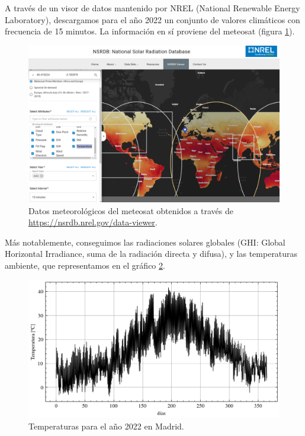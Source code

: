 A través de un visor de datos mantenido por NREL (National Renewable Energy
Laboratory), descargamos para el año 2022 un conjunto de valores climáticos con
frecuencia de 15 minutos. La información en sí proviene del meteosat (figura
\ref{fig:meteosat_nsrdb}).

\begin{figure}[h] \centering
	\centering
	\includegraphics[width=1\textwidth]{./capitulos/adquisicion_de_datos/images/meteosat_nsrdb.png}
  \caption{Datos meteorológicos del meteosat obtenidos a través de
  \url{https://nsrdb.nrel.gov/data-viewer}.}
	\label{fig:meteosat_nsrdb}
\end{figure}

Más notablemente, conseguimos las radiaciones solares globales (GHI: Global
Horizontal Irradiance, suma de la radiación directa y difusa), y las
temperaturas ambiente, que representamos en el gráfico
\ref{fig:temperatures_year}.

\begin{figure}[h] \centering
	\centering
	\includegraphics[width=1\textwidth]{./capitulos/adquisicion_de_datos/images/temperatures_year.png}
  \caption{Temperaturas para el año 2022 en Madrid.}
	\label{fig:temperatures_year}
\end{figure}
